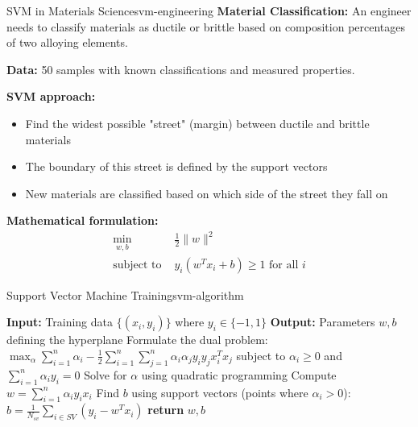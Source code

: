 \documentclass[12pt]{article}
\begin{document}
\begin{example}{SVM in Materials Science}{svm-engineering}
\textbf{Material Classification:} An engineer needs to classify materials as ductile or brittle based on composition percentages of two alloying elements.

\textbf{Data:} 50 samples with known classifications and measured properties.

\textbf{SVM approach:}
\begin{itemize}
    \item Find the widest possible "street" (margin) between ductile and brittle materials
    \item The boundary of this street is defined by the support vectors
    \item New materials are classified based on which side of the street they fall on
\end{itemize}

\textbf{Mathematical formulation:}
\begin{align}
\min_{w,b} &\frac{1}{2}\|w\|^2 \\
\text{subject to } &y_i(w^T x_i + b) \geq 1 \text{ for all } i
\end{align}

\begin{center}
\end{center}
\end{example}

\begin{algorithmenv}{Support Vector Machine Training}{svm-algorithm}
\begin{algorithmic}[1]
\State \textbf{Input:} Training data $\{(x_i, y_i)\}$ where $y_i \in \{-1,1\}$
\State \textbf{Output:} Parameters $w, b$ defining the hyperplane
\State Formulate the dual problem:
\State $\max_\alpha \sum_{i=1}^n \alpha_i - \frac{1}{2}\sum_{i=1}^n\sum_{j=1}^n \alpha_i \alpha_j y_i y_j x_i^T x_j$
\State subject to $\alpha_i \geq 0$ and $\sum_{i=1}^n \alpha_i y_i = 0$
\State Solve for $\alpha$ using quadratic programming
\State Compute $w = \sum_{i=1}^n \alpha_i y_i x_i$
\State Find $b$ using support vectors (points where $\alpha_i > 0$):
\State $b = \frac{1}{N_{sv}} \sum_{i \in SV} (y_i - w^T x_i)$
\State \textbf{return} $w, b$
\end{algorithmic}
\end{algorithmenv}
\end{document}
